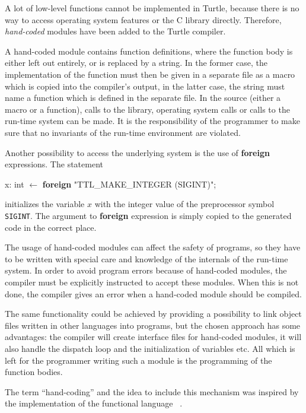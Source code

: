 %
A lot of low-level functions cannot be implemented in Turtle, because
there is no way to access operating system features or the C library
directly.  Therefore, {\em hand-coded} modules have been added to the
Turtle compiler.

A hand-coded module contains function definitions, where the function
body is either left out entirely, or is replaced by a string.  In the
former case, the implementation of the function must then be given in
a separate file as a \cee{} macro which is copied into the \turtle{}
compiler's output, in the latter case, the string must name a \cee{}
function which is defined in the separate file.  In the \cee{} source
(either a macro or a function), calls to the \cee{} library, operating
system calls or calls to the \turtle{} run-time system can be made.
It is the responsibility of the programmer to make sure that no
invariants of the run-time environment are violated.

Another possibility to access the underlying system is the use of {\bf
  foreign} expressions.  The statement
%
\begin{ttlprog}
\>\ttlVar{} x: int $\leftarrow$ {\bf foreign} "TTL\_MAKE\_INTEGER (SIGINT)";
\end{ttlprog}
%
initializes the variable $x$ with the integer value of the \cee{}
preprocessor symbol {\tt SIGINT}.  The argument to {\bf foreign}
expression is simply copied to the generated code in the correct
place.

The usage of hand-coded modules can affect the safety of \turtle{}
programs, so they have to be written with special care and knowledge
of the internals of the run-time system.  In order to avoid program
errors because of hand-coded modules, the \turtle{} compiler must be
explicitly instructed to accept these modules.  When this is not done,
the compiler gives an error when a hand-coded module should be
compiled.

The same functionality could be achieved by providing a possibility to
link object files written in other languages into \turtle{} programs,
but the chosen approach has some advantages: the compiler will create
interface files for hand-coded modules, it will also handle the
dispatch loop and the initialization of variables etc.  All which is
left for the programmer writing such a module is the programming of
the function bodies.

The term ``hand-coding'' and the idea to include this mechanism was
inspired by the implementation of the functional language
\opal{}~\cite{Pepper.Opal}.

